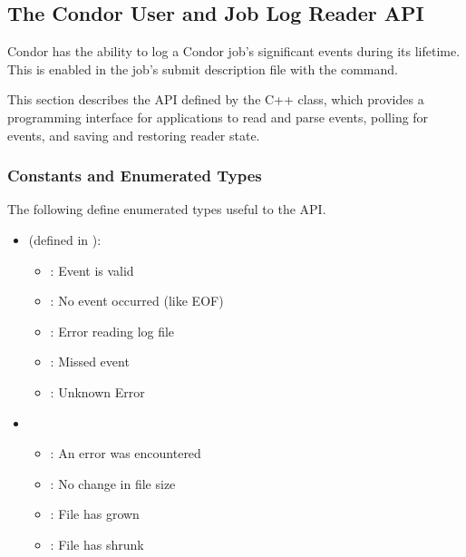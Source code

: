 \subsection{\label{sec:job-log-reader}The Condor User and Job Log Reader API}

Condor has the ability to log a Condor job's significant events during 
its lifetime.
This is enabled in the job's submit description file with the
 command.

This section describes the API defined by the C++  class,
which provides a programming interface for applications
to read and parse events,
polling for events, and saving and restoring reader state.

\subsubsection{Constants and Enumerated Types}

The following define enumerated types useful to the API.

\begin{itemize}
\item {} (defined in ):
  \begin{itemize}
    \item {}: Event is valid
    \item {}: No event occurred (like EOF)
    \item {}: Error reading log file
    \item {}: Missed event
    \item {}: Unknown Error
  \end{itemize}

\item {}
  \begin{itemize}
    \item {}: An error was encountered
    \item {}: No change in file size
    \item {}: File has grown
    \item {}: File has shrunk
  \end{itemize}

\end{itemize}


